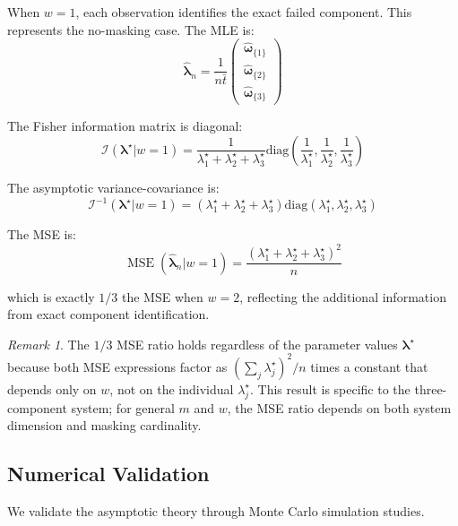 \documentclass[12pt]{article}
\newcommand{\tparam}[1]{{#1}^{\star}}  %
\newcommand{\expomle}{\boldsymbol{\hat{\lambda}}_n}
\newcommand{\infomatrx}{\mathcal{I}}
\newcommand{\cntsymb}{\boldsymbol{\hat\omega}}
\newcommand{\cnt}[1]{\cntsymb_{\{#1\}}}
\renewcommand{\vec}[1]{\boldsymbol{#1}}
\DeclareMathOperator{\MSE}{\mathrm{MSE}}
\theoremstyle{definition}
\theoremstyle{remark}
\newtheorem{remark}[theorem]{Remark}
\begin{document}
When $w=1$, each observation identifies the exact failed component. This represents the no-masking case. The MLE is:
\begin{equation}
\expomle = \frac{1}{n\bar{t}} \begin{pmatrix} \cnt{1}\\ \cnt{2}\\ \cnt{3} \end{pmatrix}
\end{equation}

The Fisher information matrix is diagonal:
\begin{equation}
\infomatrx(\tparam{\vec{\lambda}} | w=1) = \frac{1}{\tparam{\lambda}_1 + \tparam{\lambda}_2 + \tparam{\lambda}_3} \text{diag}\left(\frac{1}{\tparam{\lambda}_1}, \frac{1}{\tparam{\lambda}_2}, \frac{1}{\tparam{\lambda}_3}\right)
\end{equation}

The asymptotic variance-covariance is:
\begin{equation}
\infomatrx^{-1}(\tparam{\vec{\lambda}} | w=1) = (\tparam{\lambda}_1 + \tparam{\lambda}_2 + \tparam{\lambda}_3) \text{diag}(\tparam{\lambda}_1, \tparam{\lambda}_2, \tparam{\lambda}_3)
\end{equation}

The MSE is:
\begin{equation}
\MSE(\expomle | w=1) = \frac{(\tparam{\lambda}_1 + \tparam{\lambda}_2 + \tparam{\lambda}_3)^2}{n}
\end{equation}

which is exactly $1/3$ the MSE when $w=2$, reflecting the additional information from exact component identification.

\begin{remark}
The $1/3$ MSE ratio holds regardless of the parameter values $\tparam{\vec{\lambda}}$ because both MSE expressions factor as $(\sum_j \tparam{\lambda}_j)^2/n$ times a constant that depends only on $w$, not on the individual $\tparam{\lambda}_j$. This result is specific to the three-component system; for general $m$ and $w$, the MSE ratio depends on both system dimension and masking cardinality.
\end{remark}

\subsection{Numerical Validation}

We validate the asymptotic theory through Monte Carlo simulation studies.
\label{subsec:validation}
\end{document}
